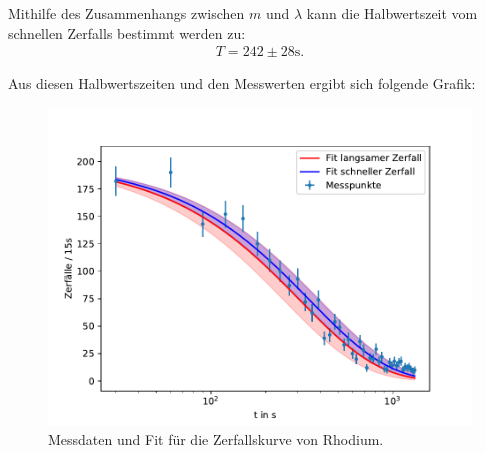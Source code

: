Mithilfe des Zusammenhangs zwischen $m$ und $\lambda $ kann die Halbwertszeit vom schnellen Zerfalls bestimmt werden zu:
\begin{align*}
    T = 242 \pm  28 \si{\second}.
\end{align*}

Aus diesen Halbwertszeiten und den Messwerten ergibt sich folgende Grafik:

\begin{figure}[H]
	\centering
	\includegraphics{Daten/Rhodium2.pdf}
	\caption{Messdaten und Fit für die Zerfallskurve von Rhodium.}
	\label{fig:zerfallskurve2}
\end{figure}